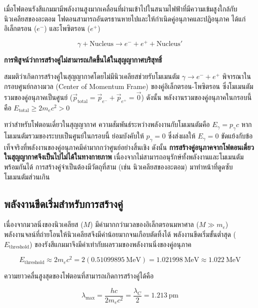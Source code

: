 เมื่อโฟตอนรังสีแกมมามีพลังงานสูงมากเคลื่อนที่ผ่านเข้าไปในสนามไฟฟ้าที่มีความเข้มสูงใกล้กับนิวเคลียสของอะตอม โฟตอนสามารถอันตรธานหายไปและให้กำเนิดคู่อนุภาคและปฏิอนุภาค ได้แก่ อิเล็กตรอน ($e^-$) และโพซิตรอน ($e^+$)

\begin{equation}
\gamma + \text{Nucleus} \longrightarrow e^- + e^+ + \text{Nucleus}'
\label{eq:pair_production_full}
\end{equation}

\textbf{การพิสูจน์ว่าการสร้างคู่ไม่สามารถเกิดขึ้นได้ในสุญญากาศบริสุทธิ์}

สมมติว่าเกิดการสร้างคู่ในสุญญากาศโดยไม่มีนิวเคลียสช่วยรับโมเมนตัม $\gamma \to e^- + e^+$ พิจารณาในกรอบศูนย์กลางมวล (Center of Momentum Frame) ของคู่อิเล็กตรอน-โพซิตรอน ซึ่งโมเมนตัมรวมของคู่อนุภาคเป็นศูนย์ ($\vec{p}_{\text{total}} = \vec{p}_{e^-} + \vec{p}_{e^+} = \vec{0}$) ดังนั้น พลังงานรวมของคู่อนุภาคในกรอบนี้คือ $E_{\text{total}} \ge 2 m_e c^2 > 0$

ทว่าสำหรับโฟตอนเดี่ยวในสุญญากาศ ความสัมพันธ์ระหว่างพลังงานกับโมเมนตัมคือ $E_\gamma = p_\gamma c$ หากโมเมนตัมรวมของระบบเป็นศูนย์ในกรอบนี้ ย่อมบังคับให้ $p_\gamma = 0$ ซึ่งส่งผลให้ $E_\gamma = 0$ ขัดแย้งกับข้อเท็จจริงที่พลังงานของคู่อนุภาคมีค่ามากกว่าศูนย์อย่างสิ้นเชิง ดังนั้น \textbf{การสร้างคู่อนุภาคจากโฟตอนเดี่ยวในสุญญากาศจึงเป็นไปไม่ได้ในทางกายภาพ} เนื่องจากไม่สามารถอนุรักษ์ทั้งพลังงานและโมเมนตัมพร้อมกันได้ การสร้างคู่จำเป็นต้องมีวัตถุที่สาม (เช่น นิวเคลียสของอะตอม) มาทำหน้าที่ดูดซับโมเมนตัมส่วนเกิน

\subsection{พลังงานขีดเริ่มสำหรับการสร้างคู่}

เนื่องจากมวลนิ่งของนิวเคลียส ($M$) มีค่ามากกว่ามวลของอิเล็กตรอนมหาศาล ($M \gg m_e$) พลังงานจลน์ที่ถ่ายโอนให้นิวเคลียสจึงมีค่าน้อยมากจนเกือบตัดทิ้งได้ พลังงานขีดเริ่มขั้นต่ำสุด ($E_{\text{threshold}}$) ของรังสีแกมมาจึงมีค่าเท่ากับผลรวมของพลังงานนิ่งของคู่อนุภาค

\begin{equation}
E_{\text{threshold}} \approx 2 m_e c^2 = 2(0.51099895~\text{MeV}) = 1.021998~\text{MeV} \approx 1.022~\text{MeV}
\label{eq:pair_threshold}
\end{equation}

ความยาวคลื่นสูงสุดของโฟตอนที่สามารถเกิดการสร้างคู่ได้คือ

\begin{equation}
\lambda_{\max} = \frac{hc}{2 m_e c^2} = \frac{\lambda_C}{2} = 1.213~\text{pm}
\end{equation}

